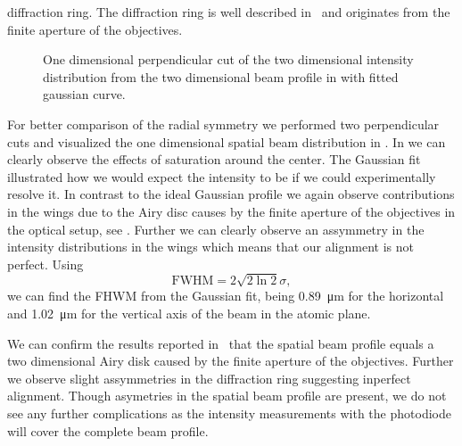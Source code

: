 diffraction ring. The diffraction ring is well described
in~\cite{Hertlein2017} and originates from the finite aperture of the
objectives.
\begin{figure}[htb]
  \centering
  \begin{adjustbox}{width=\textwidth}
    
  \end{adjustbox}
  \caption{One dimensional perpendicular cut of the two dimensional intensity
    distribution from the two dimensional beam profile in
     with fitted gaussian curve.
  }\label{fig:intensity_spatial_profile}
\end{figure}
For better comparison of the radial symmetry we performed two perpendicular
cuts and visualized the one dimensional spatial beam distribution in
.
In  we can clearly observe the effects of
saturation around the center. The Gaussian fit illustrated how we would expect
the intensity to be if we could experimentally resolve it. In contrast to the
ideal Gaussian profile we again observe contributions in the wings due to the
Airy disc causes by the finite aperture of the objectives in the optical setup,
see . Further we can clearly observe
an assymmetry in the intensity distributions in the wings which means that
our alignment is not perfect. Using
\begin{equation}
  \text{FWHM}=2\sqrt{2\ln2}\sigma
  \label{eq:fwhm_sigma},
\end{equation}
we can find the \gls{FHWM} from the Gaussian fit, being
\SI{0.89}{\micro\meter} for the horizontal and \SI{1.02}{\micro\meter} for
the vertical axis of the beam in the atomic plane.

We can confirm the results reported in~\cite{Hertlein2017} that the spatial
beam profile equals a two dimensional Airy disk caused by the finite
aperture of the objectives. Further we observe slight assymmetries in the
diffraction ring suggesting inperfect alignment. Though asymetries in the
spatial beam profile are present, we do not see any further complications as
the intensity measurements with the photodiode will cover the complete beam
profile.

